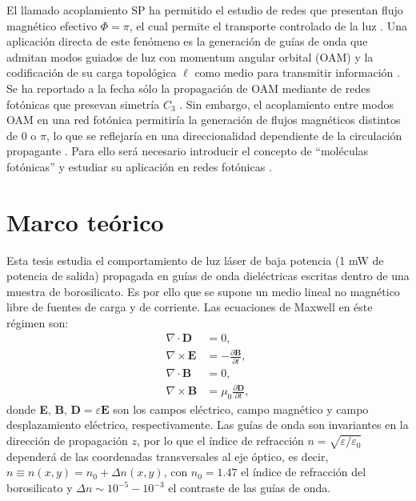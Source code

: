 \documentclass[12pt, letterpaper]{article}
\begin{document}
	El llamado acoplamiento SP ha permitido el estudio de redes que presentan flujo magnético efectivo $\Phi = \pi$, el cual permite el transporte controlado de la luz \cite{OAMCaging, ABCaging}. Una aplicación directa de este fenómeno es la generación de guías de onda que admitan modos guiados de luz con momentum angular orbital (OAM) y la codificación de su carga topológica $\ell$ como medio para transmitir información \cite{oamapp, oamfree}. Se ha reportado a la fecha sólo la propagación de OAM mediante de redes fotónicas que presevan simetría $C_3$ \cite{OAMWG, vortex}. Sin embargo, el acoplamiento entre modos OAM en una red fotónica permitiría la generación de flujos magnéticos distintos de $0$ o $\pi$, lo que se reflejaría en una direccionalidad dependiente de la circulación propagante \cite{vortextrim, topoOAM}. Para ello será necesario introducir el concepto de ``moléculas fotónicas'' \cite{molecules} y estudiar su aplicación en redes fotónicas \cite{SPSSH}.
\section{Marco teórico}

Esta tesis estudia el comportamiento de luz láser de baja potencia (1 mW de potencia de salida) propagada en guías de onda dieléctricas escritas dentro de una muestra de borosilicato. Es por ello que se supone un medio lineal no magnético libre de fuentes de carga y de corriente. Las ecuaciones de Maxwell en éste régimen son:
\begin{align}
	\nabla\cdot\textbf{D} &= 0, \label{eqn:gauss}
	\\	
	\nabla\times\textbf{E} &= -\frac{\partial \textbf{B}}{\partial t}, \label{eqn:faraday-lenz}
	\\	
	\nabla\cdot\textbf{B} &= 0,
	\\	
	\nabla\times\textbf{B} &= \mu_0\frac{\partial \textbf{D}}{\partial t}, \label{eqn:ampere-maxwell}
\end{align}
donde \textbf{E}, \textbf{B}, $\textbf{D}=\varepsilon\textbf{E}$ son los campos eléctrico, campo magnético y campo desplazamiento eléctrico, respectivamente. Las guías de onda son invariantes en la dirección de propagación $z$, por lo que el índice de refracción $n=\sqrt{\varepsilon/\varepsilon_0}$ dependerá de las coordenadas transversales al eje óptico, es decir, $n \equiv n(x,y) = n_0 + \Delta n(x,y)$, con $n_0=1.47$ el índice de refracción del borosilicato y $\Delta n \sim 10^{-5}-10^{-3}$ el contraste de las guías de onda.
\end{document}
